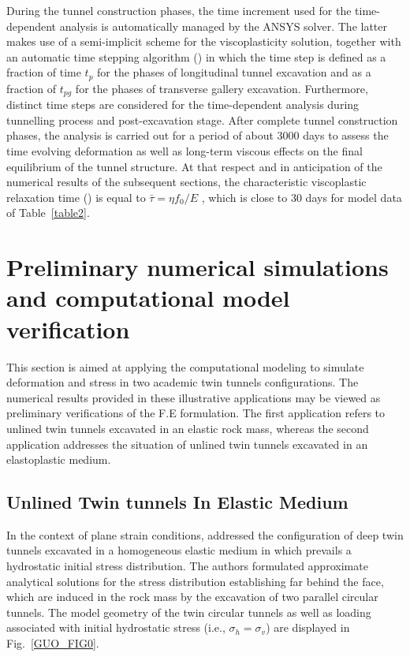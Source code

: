 \documentclass[Journal,letterpaper, NoLists,SectionNumbers]{ascelike-new}
\begin{document}
During the tunnel construction phases, the time increment used for the time-dependent analysis is automatically managed by the ANSYS solver. The latter makes use of a semi-implicit scheme for the viscoplasticity solution, together with an automatic time stepping algorithm () in which the time step is defined as a fraction of time $t_p$ for the phases of longitudinal tunnel excavation and as a fraction of $t_{pg}$ for the phases of transverse gallery excavation. Furthermore, distinct time steps are considered for the time-dependent analysis during tunnelling process and post-excavation stage. After complete tunnel construction phases, the analysis is carried out for a period of about $3000$ days to assess the time evolving deformation as well as long-term viscous effects on the final equilibrium of the tunnel structure. At that respect and in anticipation of the numerical results of the subsequent sections, the characteristic viscoplastic relaxation time () is equal to $\bar{\tau} = \eta f_0 / E$ , which is close to $30$ days for model data of Table~\ref{table2}.




\section{Preliminary numerical simulations and computational model verification}\label{sec6}

This section is aimed at applying the computational modeling to simulate deformation and stress in two academic twin tunnels configurations. The numerical results provided in these illustrative applications may be viewed as preliminary verifications of the F.E formulation. The first application refers to unlined twin tunnels excavated in an elastic rock mass, whereas the second application addresses the situation of unlined twin tunnels excavated in an elastoplastic medium.

\subsection{Unlined Twin tunnels In Elastic Medium}

In the context of plane strain conditions,  addressed the configuration of deep twin tunnels excavated in a homogeneous elastic medium in which prevails a hydrostatic initial stress distribution. The authors formulated approximate analytical solutions for the stress distribution establishing far behind the face, which are induced in the rock mass by the excavation of two parallel circular tunnels. The model geometry of the twin circular tunnels as well as loading associated with initial hydrostatic stress (i.e., $\sigma_h = \sigma_v$) are displayed in Fig.~\ref{GUO_FIG0}.
\end{document}
